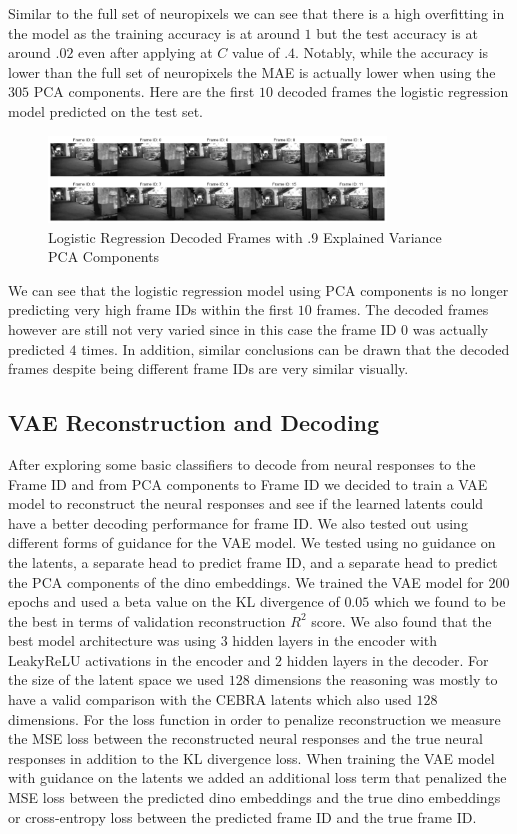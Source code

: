 \documentclass[12pt, letterpaper]{article}
\begin{document}
Similar to the full set of neuropixels we can see that there is a high overfitting in the model as the training accuracy is at around $1$ but the test accuracy is at around $.02$ even after applying at $C$ value of $.4$. Notably, while the accuracy is lower than the full set of neuropixels the MAE is actually lower when using the $305$ PCA components. Here are the first $10$ decoded frames the logistic regression model predicted on the test set.

\begin{figure}[H]
    \centering
    \includegraphics[width=0.8\textwidth]{.9_pca_logistic_reg_video.png}
    \caption{Logistic Regression Decoded Frames with .9 Explained Variance PCA Components}
    \label{fig:pca_logistic_frame_id_decoded}
\end{figure}

We can see that the logistic regression model using PCA components is no longer predicting very high frame IDs within the first $10$ frames. The decoded frames however are still not very varied since in this case the frame ID $0$ was actually predicted $4$ times. In addition, similar conclusions can be drawn that the decoded frames despite being different frame IDs are very similar visually.

\subsection{VAE Reconstruction and Decoding}
After exploring some basic classifiers to decode from neural responses to the Frame ID and from PCA components to Frame ID we decided to train a VAE model to reconstruct the neural responses and see if the learned latents could have a better decoding performance for frame ID. We also tested out using different forms of guidance for the VAE model. We tested using no guidance on the latents, a separate head to predict frame ID, and a separate head to predict the PCA components of the dino embeddings. We trained the VAE model for $200$ epochs and used a beta value on the KL divergence of $0.05$ which we found to be the best in terms of validation reconstruction $R^2$ score. We also found that the best model architecture was using $3$ hidden layers in the encoder with LeakyReLU activations in the encoder and $2$ hidden layers in the decoder. For the size of the latent space we used $128$ dimensions the reasoning was mostly to have a valid comparison with the CEBRA latents which also used $128$ dimensions. For the loss function in order to penalize reconstruction we measure the MSE loss between the reconstructed neural responses and the true neural responses in addition to the KL divergence loss. When training the VAE model with guidance on the latents we added an additional loss term that penalized the MSE loss between the predicted dino embeddings and the true dino embeddings or cross-entropy loss between the predicted frame ID and the true frame ID.
\end{document}

